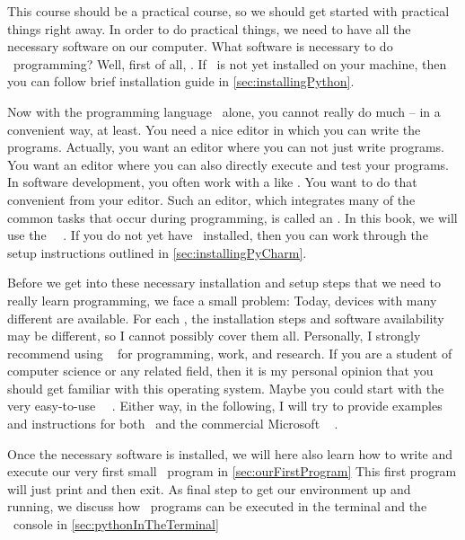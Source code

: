 %
%
This course should be a practical course, so we should get started with practical things right away.
In order to do practical things, we need to have all the necessary software on our computer.
What software is necessary to do \python\ programming?
Well, first of all, \python.
If \python\ is not yet installed on your machine, then you can follow brief installation guide in \cref{sec:installingPython}.

Now with the programming language \python\ alone, you cannot really do much -- in a convenient way, at least.
You need a nice editor in which you can write the programs.
Actually, you want an editor where you can not just write programs.
You want an editor  where you can also directly execute and test your programs.
In software development, you often work with a  like \git.
You want to do that convenient from your editor.
Such an editor, which integrates many of the common tasks that occur during programming, is called an .
In this book, we will use the \pycharm\ ~\cite{VHN2023HOADWP,Y2022PPADT}.
If you do not yet have \pycharm\ installed, then you can work through the setup instructions outlined in \cref{sec:installingPyCharm}.

Before we get into these necessary installation and setup steps that we need to really learn programming, we face a small problem:
Today, devices with many different  are available.
For each , the installation steps and software availability may be different, so I cannot possibly cover them all.
Personally, I strongly recommend using \linux~\cite{T1999TLE,B2022ELATCL,H2022LML} for programming, work, and research.
If you are a student of computer science or any related field, then it is my personal opinion that you should get familiar with this operating system.
Maybe you could start with the very easy-to-use \ubuntu\ \linux~\cite{CN2020ULB}.
Either way, in the following, I will try to provide examples and instructions for both \ubuntu\ and the commercial Microsoft \windows~\cite{B2023W1IO} .

Once the necessary software is installed, we will here also learn how to write and execute our very first small \python\ program in \cref{sec:ourFirstProgram}%
This first program will just print  and then exit.
As final step to get our environment up and running, we discuss how \python\ programs can be executed in the terminal and the \python\ console in \cref{sec:pythonInTheTerminal}%
%
%
%
%
%
%
%
\endhsection%
%
